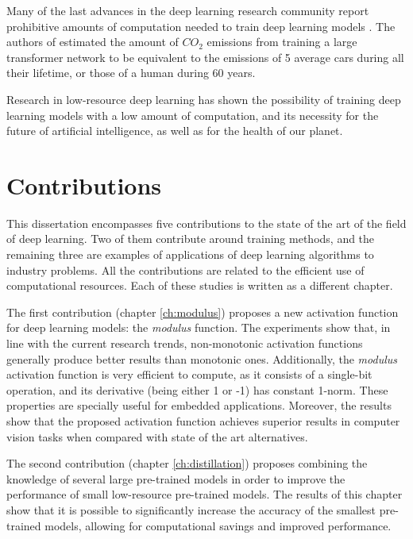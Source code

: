 Many of the last advances in the deep learning research community report prohibitive amounts of computation needed to train deep learning models \autocite{silver2016, kechyn2018, brown2020, floridi2020}. The authors of \autocite{strubell2019} estimated the amount of $CO_2$ emissions from training a large transformer network to be equivalent to the emissions of 5 average cars during all their lifetime, or those of a human during 60 years. 

Research in low-resource deep learning \autocite{howard2017, Han2017, Gao2018, sanchez2020, so2021} has shown the possibility of training deep learning models with a low amount of computation, and its necessity for the future of artificial intelligence, as well as for the health of our planet.


\section{Contributions}
This dissertation encompasses five contributions to the state of the art of the field of deep learning. Two of them contribute around training methods, and the remaining three are examples of applications of deep learning algorithms to industry problems. All the contributions are related to the efficient use of computational resources. Each of these studies is written as a different chapter.

The first contribution (chapter \ref{ch:modulus}) proposes a new activation function for deep learning models: the \textit{modulus} function. The experiments show that, in line with the current research trends, non-monotonic activation functions generally produce better results than monotonic ones. Additionally, the \textit{modulus} activation function is very efficient to compute, as it consists of a single-bit operation, and its derivative (being either 1 or -1) has constant 1-norm. These properties are specially useful for embedded applications. Moreover, the results show that the proposed activation function achieves superior results in computer vision tasks when compared with state of the art alternatives.

The second contribution (chapter \ref{ch:distillation}) proposes combining the knowledge of several large pre-trained models in order to improve the performance of small low-resource pre-trained models. The results of this chapter show that it is possible to significantly increase the accuracy of the smallest pre-trained models, allowing for computational savings and improved performance.

